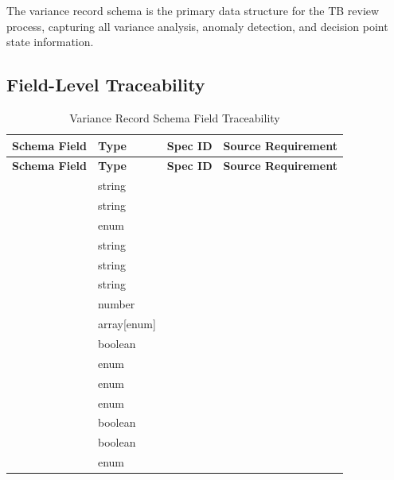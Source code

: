 The variance record schema is the primary data structure for the TB
review process, capturing all variance analysis, anomaly detection,
and decision point state information.

\subsection{Field-Level Traceability}

\begin{longtable}{@{}L{4cm}L{2.5cm}C{2cm}L{4.5cm}@{}}
\caption{Variance Record Schema Field Traceability}
\label{tab:variance-record-fields} \\
\toprule
\textbf{Schema Field} & \textbf{Type} & \textbf{Spec ID} & \textbf{Source Requirement} \\
\midrule
\endfirsthead
\toprule
\textbf{Schema Field} & \textbf{Type} & \textbf{Spec ID} & \textbf{Source Requirement} \\
\midrule
\endhead
{} & string &  &  \\
 & string &  &  \\
 & enum &  &  \\
 & string &  &  \\
 & string &  &  \\
 & string &  &  \\
 & number &  &  \\
 & array[enum] &  &  \\
 & boolean &  &  \\
 & enum &  &  \\
 & enum &  &  \\
 & enum &  &  \\
 & boolean &  &  \\
 & boolean &  &  \\
 & enum &  &  \\
\bottomrule
\end{longtable}

